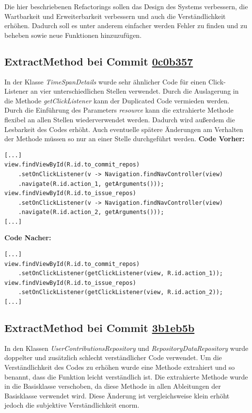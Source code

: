 \documentclass[12pt]{article}
\begin{document}
Die hier beschriebenen Refactorings sollen das Design des Systems verbessern, die Wartbarkeit und Erweiterbarkeit verbessern und auch die Verständlichkeit erhöhen.
Dadurch soll es unter anderem einfacher werden Fehler zu finden und zu beheben sowie neue Funktionen hinzuzufügen.


\subsection{ExtractMethod bei Commit \href{https://github.com/lukaspanni/OpenSourceStats/commit/0c0b357dee742575d8465ae26e64152bfecbf5ab} {0c0b357}}
\label{sec:ExtractMethod_TimeSpanDetails}

In der Klasse \textit{TimeSpanDetails} wurde sehr ähnlicher Code für einen Click-Listener an vier unterschiedlichen Stellen verwendet. Durch die Auslagerung in die Methode \textit{getClickListener}  kann der Duplicated Code vermieden werden. Durch die Einführung des Parameters \textit{resource} kann die extrahierte Methode flexibel an allen Stellen wiederverwendet werden. Dadurch wird außerdem die Lesbarkeit des Codes erhöht.
Auch eventuelle spätere Änderungen am Verhalten der Methode müssen so nur an einer Stelle durchgeführt werden.
\newline
\textbf{Code Vorher:} 
\begin{lstlisting}[breaklines=false]
[...]
view.findViewById(R.id.to_commit_repos)
    .setOnClickListener(v -> Navigation.findNavController(view)
    .navigate(R.id.action_1, getArguments()));
view.findViewById(R.id.to_issue_repos)
    .setOnClickListener(v -> Navigation.findNavController(view)
    .navigate(R.id.action_2, getArguments()));
[...]
\end{lstlisting}
\textbf{Code Nacher:} 
\begin{lstlisting}[breaklines=false]
[...]
view.findViewById(R.id.to_commit_repos)
    .setOnClickListener(getClickListener(view, R.id.action_1));
view.findViewById(R.id.to_issue_repos)
    .setOnClickListener(getClickListener(view, R.id.action_2));
[...]
\end{lstlisting}

\newpage
\subsection{ExtractMethod bei Commit \href{https://github.com/lukaspanni/OpenSourceStats/commit/3b1eb5bf6750c3ccaeb05962ec8a8ae743adbf2c} {3b1eb5b}}
\label{sec:ExtractMethod_Repository}

In den Klassen \textit{UserContributionsRepository} und \textit{RepositoryDataRepository} wurde doppelter und zusätzlich schlecht verständlicher Code verwendet. Um die Verständlichkeit des Codes zu erhöhen wurde eine Methode extrahiert und so benannt, dass die Funktion leicht verständlich ist. Die extrahierte Methode wurde in die Basisklasse verschoben, da diese Methode in allen Ableitungen der Basisklasse verwendet wird. Diese Änderung ist vergleichsweise klein erhöht jedoch die subjektive Verständlichkeit enorm.
\end{document}
